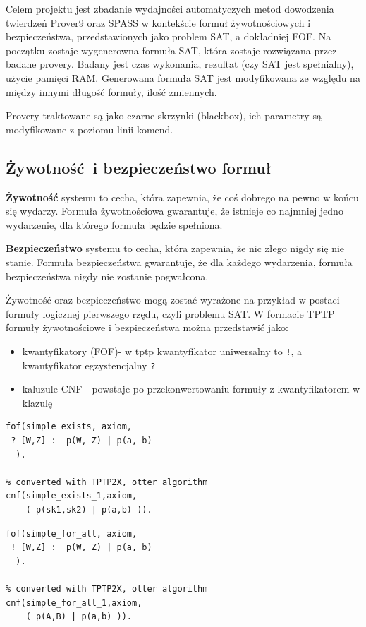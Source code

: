 \documentclass[a4paper,12pt]{article}
\begin{document}
Celem projektu jest zbadanie wydajności automatyczych metod dowodzenia twierdzeń Prover9 oraz SPASS w kontekście formuł żywotnościowych i bezpieczeństwa, przedstawionych jako problem \gls{SAT}, a dokładniej \gls{FOF}. Na początku zostaje wygenerowna formuła \gls{SAT}, która zostaje rozwiązana przez badane provery. Badany jest czas wykonania, rezultat (czy \gls{SAT} jest spełnialny), użycie pamięci RAM.  Generowana formuła \gls{SAT} jest modyfikowana ze względu na między innymi długość formuły, ilość zmiennych.

Provery traktowane są jako czarne skrzynki (blackbox), ich parametry są modyfikowane z poziomu linii komend.

\subsection{Żywotność i bezpieczeństwo formuł}

\textbf{Żywotność} systemu to cecha, która zapewnia, że coś dobrego na pewno w końcu się wydarzy. Formuła żywotnościowa gwarantuje, że istnieje co najmniej jedno wydarzenie, dla którego formuła będzie spełniona.

\textbf{Bezpieczeństwo} systemu to cecha, która zapewnia, że nic złego nigdy się nie stanie. Formuła bezpieczeństwa gwarantuje, że dla każdego wydarzenia, formuła bezpieczeństwa nigdy nie zostanie pogwałcona.

Żywotność oraz bezpieczeństwo mogą zostać wyrażone na przykład w postaci formuły logicznej pierwszego rzędu, czyli problemu SAT.
W formacie TPTP formuły żywotnościowe i bezpieczeństwa można przedstawić jako:
\begin{itemize}
  \item kwantyfikatory (\gls{FOF})- w tptp kwantyfikator uniwersalny to \texttt{!}, a kwantyfikator egzystencjalny \texttt{?}
  \item kaluzule \gls{CNF} - powstaje po przekonwertowaniu formuły z kwantyfikatorem w klazulę
\end{itemize}

\begin{verbatim}
fof(simple_exists, axiom,
 ? [W,Z] :  p(W, Z) | p(a, b)
  ).

% converted with TPTP2X, otter algorithm
cnf(simple_exists_1,axiom,
    ( p(sk1,sk2) | p(a,b) )).
\end{verbatim}

\begin{verbatim}
fof(simple_for_all, axiom,
 ! [W,Z] :  p(W, Z) | p(a, b)
  ).

% converted with TPTP2X, otter algorithm
cnf(simple_for_all_1,axiom,
    ( p(A,B) | p(a,b) )).
\end{verbatim}
\end{document}
